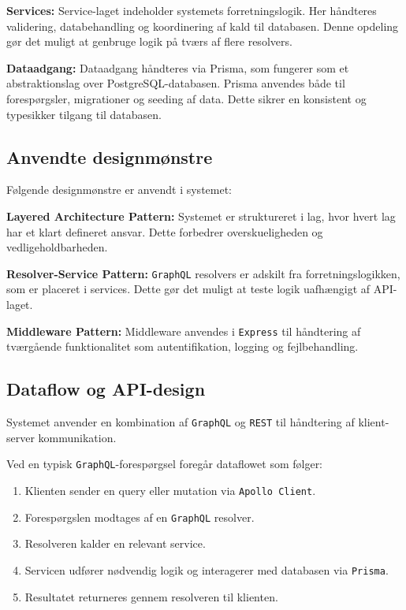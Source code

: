 \textbf{Services:}
Service-laget indeholder systemets forretningslogik.
Her håndteres validering, databehandling og koordinering af kald til databasen.
Denne opdeling gør det muligt at genbruge logik på tværs af flere resolvers.

\textbf{Dataadgang:}
Dataadgang håndteres via Prisma, som fungerer som et abstraktionslag over PostgreSQL-databasen.
Prisma anvendes både til forespørgsler, migrationer og seeding af data.
Dette sikrer en konsistent og typesikker tilgang til databasen.

\subsection{Anvendte designmønstre}

Følgende designmønstre er anvendt i systemet:

\textbf{Layered Architecture Pattern:}
Systemet er struktureret i lag, hvor hvert lag har et klart defineret ansvar.
Dette forbedrer overskueligheden og vedligeholdbarheden.

\textbf{Resolver-Service Pattern:}
\texttt{GraphQL} resolvers er adskilt fra forretningslogikken, som er placeret i services.
Dette gør det muligt at teste logik uafhængigt af API-laget.

\textbf{Middleware Pattern:}
Middleware anvendes i \texttt{Express} til håndtering af tværgående funktionalitet som autentifikation,
logging og fejlbehandling.

\subsection{Dataflow og API-design}

Systemet anvender en kombination af \texttt{GraphQL} og \texttt{REST} til håndtering af klient-server
kommunikation.

Ved en typisk \texttt{GraphQL}-forespørgsel foregår dataflowet som følger:

\begin{enumerate}
    \item Klienten sender en query eller mutation via \texttt{Apollo Client}.
    \item Forespørgslen modtages af en \texttt{GraphQL} resolver.
    \item Resolveren kalder en relevant service.
    \item Servicen udfører nødvendig logik og interagerer med databasen via \texttt{Prisma}.
    \item Resultatet returneres gennem resolveren til klienten.
\end{enumerate}

